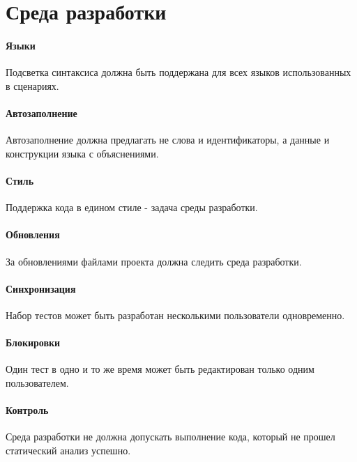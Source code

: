 \section{Среда разработки}

\paragraph{Языки}

Подсветка синтаксиса должна быть поддержана для всех языков использованных в сценариях.

\paragraph{Автозаполнение}

Автозаполнение должна предлагать не слова и идентификаторы, а данные и конструкции языка с объяснениями.

\paragraph{Стиль}

Поддержка кода в едином стиле - задача среды разработки.

\paragraph{Обновления}

За обновлениями файлами проекта должна следить среда разработки.

\paragraph{Синхронизация}

Набор тестов может быть разработан несколькими пользователи одновременно.

\paragraph{Блокировки}

Один тест в одно и то же время может быть редактирован только одним пользователем.

\paragraph{Контроль}

Среда разработки не должна допускать выполнение кода, который не прошел статический анализ успешно.


